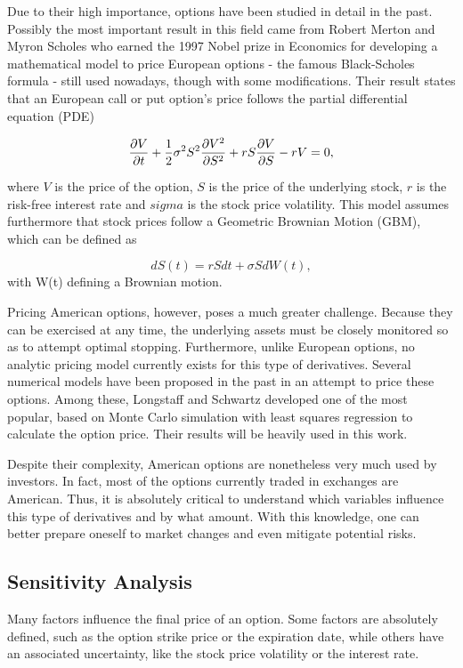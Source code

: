 \documentclass[a4paper,prd,twocolumn,nofootinbib,superscriptaddress,floatfix]{revtex4}
\begin{document}
Due to their high importance, options have been studied in detail in the past.
Possibly the most important result in this field came from Robert Merton and Myron Scholes who earned the 1997 Nobel prize in Economics for developing a mathematical model to price European options - the famous Black-Scholes formula - still used nowadays, though with some modifications. Their result states that an European call or put option's price follows the partial differential equation (PDE)

\begin{equation}
\pdv{V}{t}+\frac{1}{2}\sigma^2S^2\pdv{V^2}{S^2}+rS\pdv{V}{S}-rV=0,
\end{equation}

\noindent where $V$ is the price of the option, $S$ is the price of the underlying stock, $r$ is the risk-free interest rate and $sigma$ is the stock price volatility.
This model assumes furthermore that stock prices follow a Geometric Brownian Motion (GBM), which can be defined as

\begin{equation}
dS(t)=rSdt+\sigma SdW(t),
\end{equation}
\noindent with W(t) defining a Brownian motion.

Pricing American options, however, poses a much greater challenge. Because they can be exercised at any time, the underlying assets must be closely monitored so as to attempt optimal stopping.
Furthermore, unlike European options, no analytic pricing model currently exists for this type of derivatives. Several numerical models have been proposed in the past in an attempt to price these options. Among these, Longstaff and Schwartz developed one of the most popular, based on Monte Carlo simulation with least squares regression to calculate the option price. Their results will be heavily used in this work.

Despite their complexity, American options are nonetheless very much used by investors. In fact, most of the options currently traded in exchanges are American. Thus, it is absolutely critical to understand which variables influence this type of derivatives and by what amount. With this knowledge, one can better prepare oneself to market changes and even mitigate potential risks.

\subsection{Sensitivity Analysis}
Many factors influence the final price of an option.
Some factors are absolutely defined, such as the option strike price or the expiration date, while others have an associated uncertainty, like the stock price volatility or the interest rate.
\end{document}
